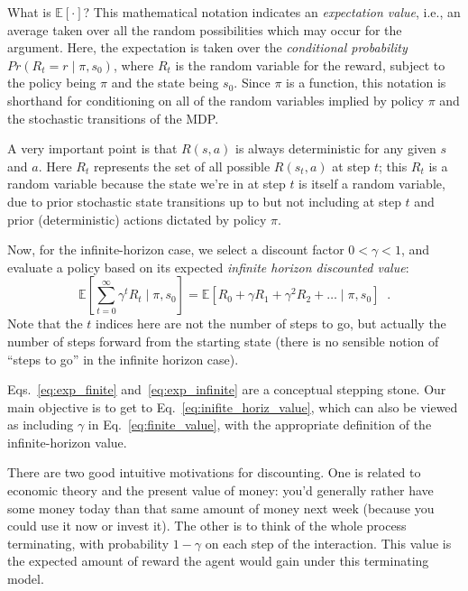 \begin{examplebox}
  What is $\mathbb{E}\left[ \cdot \right ]$?  This mathematical
  notation indicates an {\em expectation value}, i.e., an average
  taken over all the random possibilities which may occur for the
  argument.  Here, the expectation is taken over the {\em conditional
      probability} $Pr(R_t = r \mid \pi, s_0)$, where $R_t$ is the random
  variable for the reward, subject to the policy being $\pi$ and the
  state being $s_0$. Since $\pi$ is a function, this notation is
  shorthand for conditioning on all of the random variables implied by
  policy $\pi$ and the stochastic transitions of the MDP.

  \bigskip
  A very important point is that $R(s,a)$ is always deterministic for
  any given $s$ and $a$. Here $R_t$ represents the set of all possible
  $R(s_t,a)$ at step $t$; this $R_t$ is a random variable because
  the state we're in at step $t$ is itself a random variable, due to prior
  stochastic state transitions up to but not including at step $t$ and prior
  (deterministic) actions dictated by policy $\pi.$
\end{examplebox}

Now, for the infinite-horizon case, we select a discount factor $0 < \gamma < 1$,
and evaluate a policy based on its expected {\it{infinite horizon discounted value}}:
\begin{equation}
  \mathbb{E}\left[\sum_{t = 0}^{\infty}\gamma^tR_t \mid \pi, s_0\right]
  = \mathbb{E}\left[R_0  + \gamma R_1 + \gamma^2 R_2 + \ldots \mid \pi,  s_0\right] \;\;.
  \label{eq:exp_infinite}
\end{equation}
Note that the $t$ indices here are not the number of steps to go, but
actually the number of steps forward from the starting state (there is
no sensible notion  of ``steps to go'' in the infinite horizon case).

\begin{examplebox}
  Eqs.~\ref{eq:exp_finite} and~\ref{eq:exp_infinite} are a conceptual
  stepping stone. Our main objective is to get to
  Eq.~\ref{eq:inifite_horiz_value}, which can also be viewed
  as including $\gamma$ in Eq.~\ref{eq:finite_value}, with
  the appropriate definition of the infinite-horizon value.
\end{examplebox}

There are two good intuitive motivations for discounting.  One is
related to economic theory and the present value of money: you'd
generally rather have some money today than that same amount of money
next week (because you could use it now or invest it).  The other is
to think of the whole process terminating, with probability $1-\gamma$
on each step of the interaction.  This value is the expected amount of
reward the agent would gain under this terminating model.


